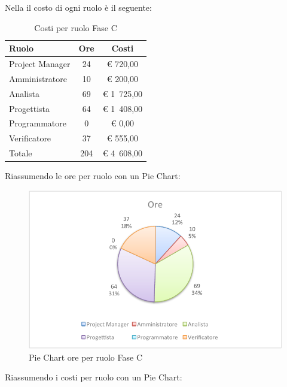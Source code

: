 				Nella  il costo di ogni ruolo è il seguente:
				\begin{table}[H]
					\begin{center}
						\begin{tabular}{| l | c | c |}
							\hline
							Ruolo 			& Ore 	& Costi  \\ \hline
							
							Project Manager	& 24 		& \euro{} 720,00 	\\
							Amministratore 		& 10 		& \euro{} 200,00 	\\
							Analista	 		& 69 		& \euro{} 1~725,00 	\\
							Progettista 		& 64 		& \euro{} 1~408,00  	\\
							Programmatore		& 0		& \euro{} 0,00	\\
							Verificatore		& 37 		& \euro{} 555,00 	\\ \hline \hline
							
							Totale	 		& 204 	& \euro{} 4~608,00 	\\ \hline
						\end{tabular}
					\end{center}
					\caption{Costi per ruolo Fase C}
				\end{table}
				Riassumendo le ore per ruolo con un Pie Chart:
				\begin{figure}[H]\centering
					\includegraphics[width=\textwidth]{PianoDiProgetto/Pics/ChartTotOreFaseC.pdf}
					\caption{Pie Chart ore per ruolo Fase C}
				\end{figure}
				Riassumendo i costi per ruolo con un Pie Chart:

